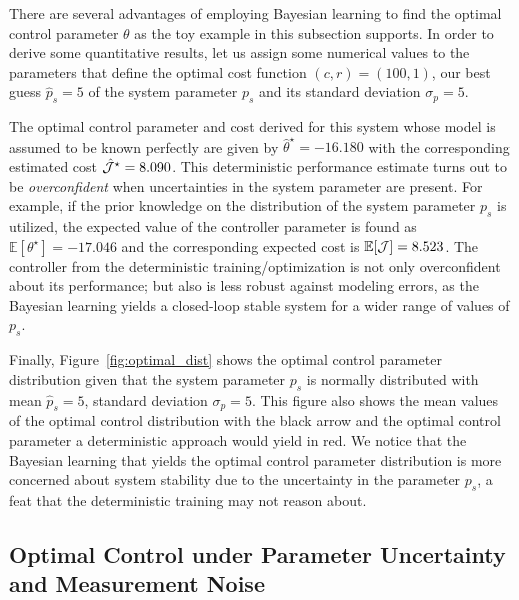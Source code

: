 There are several advantages of employing Bayesian learning to find the optimal
control parameter $\theta$ as the toy example in this subsection supports. 
%
In order to derive some quantitative results, let us assign some numerical
values to the parameters that define the optimal cost function $(c,r) = (100, 1)$, our best
guess $\hat{p}_s = 5$ of the system parameter $p_s$ and its standard deviation $\sigma_p = 5$.


The optimal control parameter and cost derived for this system whose model is
assumed to be known perfectly are given by $\hat{\theta}^\star = -16.180$ with
the corresponding estimated cost $\hat{\mathcal{J}}^\star = 8.090$.
%
This deterministic performance estimate turns out to be \textit{overconfident} when
uncertainties in the system parameter are present. 
%
For example, if the prior knowledge on the distribution of the system parameter
$p_s$ is utilized, the expected value of the controller parameter is found as
$\mathbb{E}[\theta^\star] = -17.046$ and the corresponding expected cost is
$\mathbb{E}[\mathcal{J}] = 8.523$. 
%
The controller from the deterministic training/optimization is not only
overconfident about its performance; but also is less robust against modeling
errors, as the Bayesian learning yields a closed-loop stable system for a wider
range of values of $p_s$.

Finally, Figure~\ref{fig:optimal_dist} shows the optimal control parameter
distribution given that the system parameter $p_s$ is normally distributed with
mean $\hat{p}_s = 5$, standard deviation $\sigma_p = 5$.
%
This figure also shows the mean values of the optimal control distribution with
the black arrow and the optimal control parameter a deterministic approach would
yield in red. 
%
We notice that the Bayesian learning that yields the optimal control parameter
distribution is more concerned about system stability due to the uncertainty in
the parameter $p_s$, a feat that the deterministic training may not reason about.

\subsection{Optimal Control under Parameter Uncertainty and Measurement
Noise}

